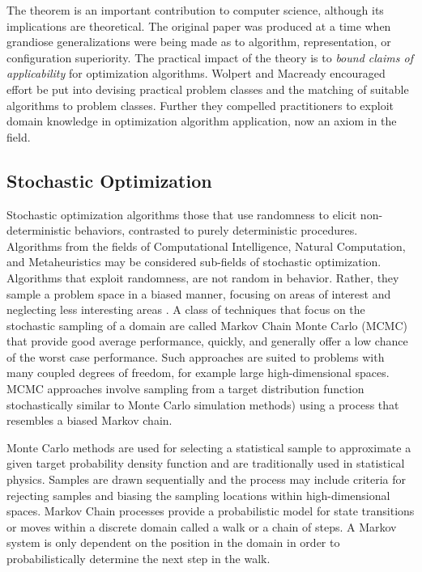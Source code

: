 \documentclass[a4paper, 11pt]{article}
\begin{document}
The theorem is an important contribution to computer science, although its implications are theoretical. The original paper was produced at a time when grandiose generalizations were being made as to algorithm, representation, or configuration superiority. The practical impact of the theory is to \emph{bound claims of applicability} for optimization algorithms. Wolpert and Macready encouraged effort be put into devising practical problem classes and the matching of suitable algorithms to problem classes. Further they compelled practitioners to exploit domain knowledge in optimization algorithm application, now an axiom in the field.

% 
% 
\subsection{Stochastic Optimization}
\label{subsec:stochastic}
Stochastic optimization algorithms those that use randomness to elicit non-deterministic behaviors, contrasted to purely deterministic procedures. Algorithms from the fields of Computational Intelligence, Natural Computation, and Metaheuristics may be considered sub-fields of stochastic optimization. Algorithms that exploit randomness, are not random in behavior. Rather, they sample a problem space in a biased manner, focusing on areas of interest and neglecting less interesting areas \cite{Spall2003}. 
A class of techniques that focus on the stochastic sampling of a domain are called Markov Chain Monte Carlo (MCMC) that provide good average performance, quickly, and generally offer a low chance of the worst case performance. Such approaches are suited to problems with many coupled degrees of freedom, for example large high-dimensional spaces. MCMC approaches involve sampling from a target distribution function stochastically similar to Monte Carlo simulation methods) using a process that resembles a biased Markov chain.

Monte Carlo methods are used for selecting a statistical sample to approximate a given target probability density function and are traditionally used in statistical physics. Samples are drawn sequentially and the process may include criteria for rejecting samples and biasing the sampling locations within high-dimensional spaces. 
Markov Chain processes provide a probabilistic model for state transitions or moves within a discrete domain called a walk or a chain of steps. A Markov system is only dependent on the position in the domain in order to probabilistically determine the next step in the walk. 
\end{document}
